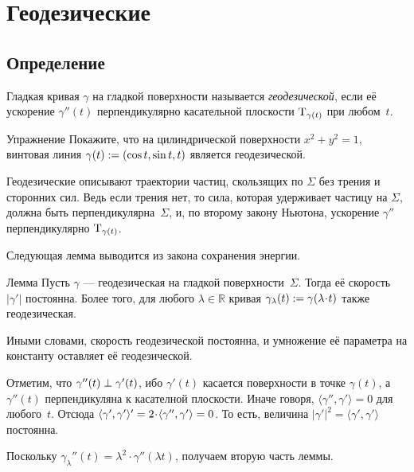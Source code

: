 \chapter{Геодезические}
\label{chap:geodesics}

\section{Определение}

Гладкая кривая $\gamma$ на гладкой поверхности называется \emph{геодезической}, если её ускорение $\gamma''(t)$ перпендикулярно касательной плоскости $\mathrm{T}_{\gamma(t)}$ при любом~$t$.

\begin{thm}{Упражнение}\label{ex:helix-geodesic}
Покажите, что на цилиндрической поверхности $x^2+y^2=1$,
винтовая линия $\gamma(t)\z\df(\cos t,\sin t, t)$ является геодезической.
\end{thm}

Геодезические описывают траектории частиц, скользящих по $\Sigma$ без трения и сторонних сил.
Ведь если трения нет, то сила, которая удерживает частицу на $\Sigma$, должна быть перпендикулярна~$\Sigma$, и, по второму закону Ньютона, ускорение $\gamma''$ перпендикулярно $\mathrm{T}_{\gamma(t)}$.

Следующая лемма выводится из закона сохранения энергии.

\begin{thm}{Лемма}\label{lem:constant-speed}
Пусть $\gamma$ --- геодезическая на гладкой поверхности~$\Sigma$. 
Тогда её скорость $|\gamma'|$ постоянна.
Более того, для любого $\lambda\in\mathbb{R}$ кривая 
$\gamma_{\lambda}(t)\df \gamma (\lambda\cdot t)$ также геодезическая. 

\end{thm}

Иными словами, скорость геодезической постоянна, и умножение её параметра на константу оставляет её геодезической.

Отметим, что $\gamma''(t)\z\perp\gamma'(t)$,
ибо $\gamma'(t)$ касается поверхности в точке $\gamma(t)$, а $\gamma''(t)$ перпендикуляна к касателной плоскости.
Иначе говоря, $\langle\gamma'',\gamma'\rangle=0$ для любого~$t$.
Отсюда  $\langle\gamma',\gamma'\rangle'\z=2\cdot \langle\gamma'',\gamma'\rangle=0$.
То есть, величина $|\gamma'|^2=\langle\gamma',\gamma'\rangle$ постоянна.

Поскольку $\gamma_{\lambda}''(t) =\lambda^2\cdot \gamma''(\lambda t)$,
получаем вторую часть леммы.
\qeds

